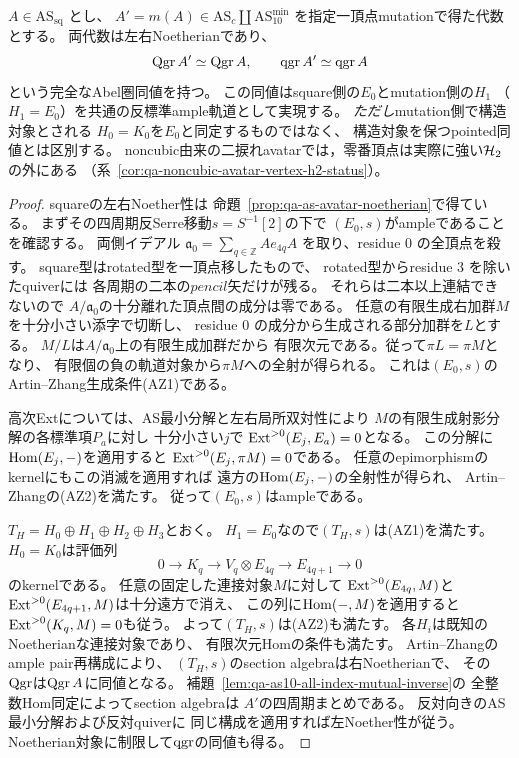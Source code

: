 \begin{proposition}[Mutation先の左右Noether性と商圏]
\label{prop:qa-as10-noetherian-qgr}
$A\in\mathrm{AS}_{\mathrm{sq}}$ とし、
$A'=m(A)\in\mathrm{AS}_{c}\amalg\mathrm{AS}_{10}^{\mathrm{min}}$
を指定一頂点mutationで得た代数とする。
両代数は左右Noetherianであり、
\[
   \operatorname{Qgr} A'\simeq\operatorname{Qgr} A,\qquad
   \operatorname{qgr} A'\simeq\operatorname{qgr} A
\]
という完全なAbel圏同値を持つ。
この同値はsquare側の$E_0$とmutation側の$H_1$
（$H_1=E_0$）を共通の反標準ample軌道として実現する。
\emph{ただし}mutation側で構造対象とされる
$H_0=K_0$を$E_0$と同定するものではなく、
構造対象を保つpointed同値とは区別する。
noncubic由来の二捩れavatarでは，零番頂点は実際に強い$\mathcal H_2$の外にある
（系~\ref{cor:qa-noncubic-avatar-vertex-h2-status}）。
\end{proposition}
\begin{proof}
squareの左右Noether性は
命題~\ref{prop:qa-as-avatar-noetherian}で得ている。
まずその四周期反Serre移動$s=S^{-1}[2]$の下で
$(E_0,s)$がampleであることを確認する。
両側イデアル
$\mathfrak a_0=\sum_{q\in\mathbb Z}Ae_{4q}A$
を取り、residue $0$ の全頂点を殺す。
square型はrotated型を一頂点移したもので、
rotated型からresidue $3$ を除いたquiverには
各周期の二本の$pencil$矢だけが残る。
それらは二本以上連結できないので
$A/\mathfrak a_0$の十分離れた頂点間の成分は零である。
任意の有限生成右加群$M$を十分小さい添字で切断し、
residue $0$ の成分から生成される部分加群を$L$とする。
$M/L$は$A/\mathfrak a_0$上の有限生成加群だから
有限次元である。従って$\pi L=\pi M$となり、
有限個の負の軌道対象から$\pi M$への全射が得られる。
これは$(E_0,s)$のArtin--Zhang生成条件(AZ1)である。

高次Extについては、AS最小分解と左右局所双対性により
$M$の有限生成射影分解の各標準項$P_a$に対し
十分小さい$j$で
$\operatorname{Ext}^{>0}(E_j,E_a)=0$となる。
この分解に$\operatorname{Hom}(E_j,-)$を適用すると
$\operatorname{Ext}^{>0}(E_j,\pi M)=0$である。
任意のepimorphismのkernelにもこの消滅を適用すれば
遠方の$\operatorname{Hom}(E_j,-)$の全射性が得られ、
Artin--Zhangの(AZ2)を満たす。
従って$(E_0,s)$はampleである。

$T_H=H_0\oplus H_1\oplus H_2\oplus H_3$とおく。
$H_1=E_0$なので$(T_H,s)$は(AZ1)を満たす。
$H_0=K_0$は評価列
\[
 0\to K_q\to V_q\otimes E_{4q}
      \longrightarrow E_{4q+1}\to0
\]
のkernelである。
任意の固定した連接対象$M$に対して
$\operatorname{Ext}^{>0}(E_{4q},M)$と
$\operatorname{Ext}^{>0}(E_{4q+1},M)$は十分遠方で消え、
この列に$\operatorname{Hom}(-,M)$を適用すると
$\operatorname{Ext}^{>0}(K_q,M)=0$も従う。
よって$(T_H,s)$は(AZ2)も満たす。
各$H_i$は既知のNoetherianな連接対象であり、
有限次元Homの条件も満たす。
Artin--Zhangのample pair再構成により、
$(T_H,s)$のsection algebraは右Noetherianで、
その$\operatorname{Qgr}$は$\operatorname{Qgr} A$に同値となる。
補題~\ref{lem:qa-as10-all-index-mutual-inverse}の
全整数Hom同定によってsection algebraは
$A'$の四周期まとめである。
反対向きのAS最小分解および反対quiverに
同じ構成を適用すれば左Noether性が従う。
Noetherian対象に制限して$\operatorname{qgr}$の同値も得る。
\end{proof}

